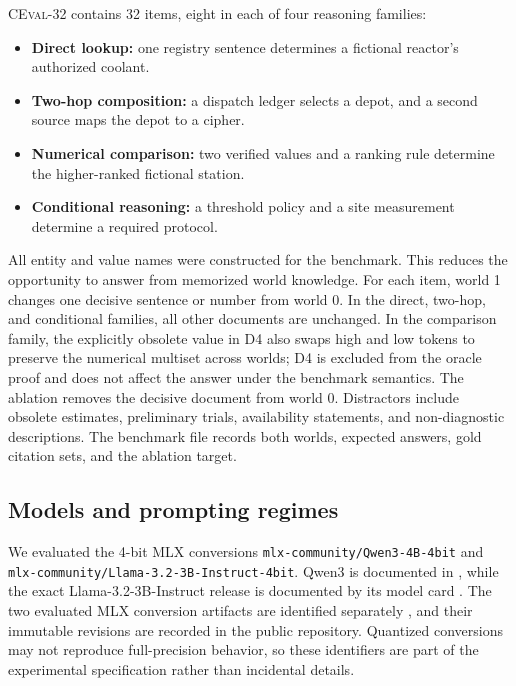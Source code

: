 \documentclass[10pt,twocolumn]{article}
\newcommand{\dataset}{\textsc{CEval-32}}
\begin{document}
\dataset{} contains 32 items, eight in each of four reasoning families:
\begin{itemize}[leftmargin=*,itemsep=1pt,topsep=3pt]
    \item \textbf{Direct lookup:} one registry sentence determines a fictional reactor's authorized coolant.
    \item \textbf{Two-hop composition:} a dispatch ledger selects a depot, and a second source maps the depot to a cipher.
    \item \textbf{Numerical comparison:} two verified values and a ranking rule determine the higher-ranked fictional station.
    \item \textbf{Conditional reasoning:} a threshold policy and a site measurement determine a required protocol.
\end{itemize}
All entity and value names were constructed for the benchmark. This reduces the opportunity to answer from memorized world knowledge. For each item, world 1 changes one decisive sentence or number from world 0. In the direct, two-hop, and conditional families, all other documents are unchanged. In the comparison family, the explicitly obsolete value in D4 also swaps high and low tokens to preserve the numerical multiset across worlds; D4 is excluded from the oracle proof and does not affect the answer under the benchmark semantics. The ablation removes the decisive document from world 0. Distractors include obsolete estimates, preliminary trials, availability statements, and non-diagnostic descriptions. The benchmark file records both worlds, expected answers, gold citation sets, and the ablation target.

\subsection{Models and prompting regimes}

We evaluated the 4-bit MLX conversions \texttt{mlx-community/Qwen3-4B-4bit} and \texttt{mlx-community/Llama-3.2-3B-Instruct-4bit}. Qwen3 is documented in \citet{yang2025qwen3}, while the exact Llama-3.2-3B-Instruct release is documented by its model card \citep{meta2024llama32}. The two evaluated MLX conversion artifacts are identified separately \citep{mlxcommunity2025qwen3,mlxcommunity2024llama32}, and their immutable revisions are recorded in the public repository. Quantized conversions may not reproduce full-precision behavior, so these identifiers are part of the experimental specification rather than incidental details.
\end{document}
